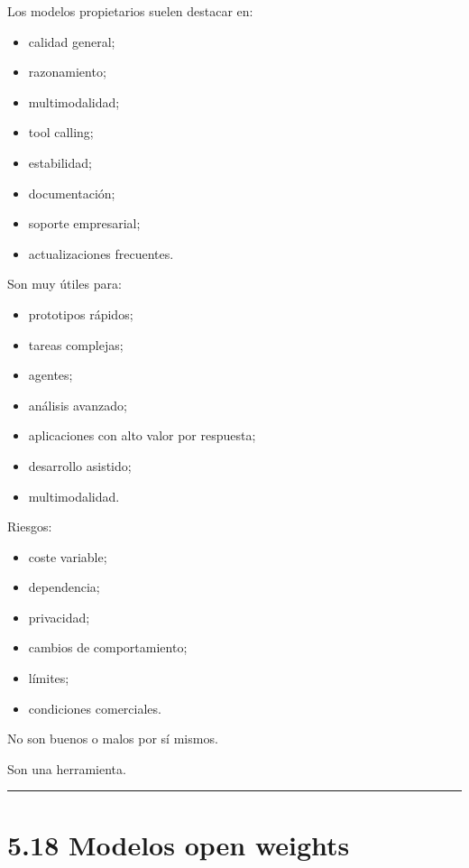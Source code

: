 Los modelos propietarios suelen destacar en:

\begin{itemize}
\tightlist
\item
  calidad general;
\item
  razonamiento;
\item
  multimodalidad;
\item
  tool calling;
\item
  estabilidad;
\item
  documentación;
\item
  soporte empresarial;
\item
  actualizaciones frecuentes.
\end{itemize}

Son muy útiles para:

\begin{itemize}
\tightlist
\item
  prototipos rápidos;
\item
  tareas complejas;
\item
  agentes;
\item
  análisis avanzado;
\item
  aplicaciones con alto valor por respuesta;
\item
  desarrollo asistido;
\item
  multimodalidad.
\end{itemize}

Riesgos:

\begin{itemize}
\tightlist
\item
  coste variable;
\item
  dependencia;
\item
  privacidad;
\item
  cambios de comportamiento;
\item
  límites;
\item
  condiciones comerciales.
\end{itemize}

No son buenos o malos por sí mismos.

Son una herramienta.

\begin{center}\rule{0.5\linewidth}{0.5pt}\end{center}

\section{5.18 Modelos open weights}\label{modelos-open-weights}


